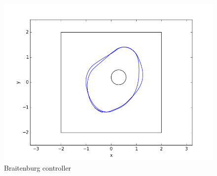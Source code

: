 \documentclass[12pt,a4paper]{article}
\begin{document}
\begin{enumerate}[label=(\alph*)]
		\begin{figure}[h!]
			\centering
			\includegraphics[width=\textwidth]{fig/2a-1.png}
			\caption{Braitenburg controller}
			\label{fig:braitenburg}
		\end{figure}


\end{enumerate}
\end{document}
